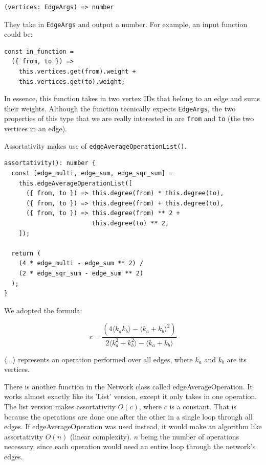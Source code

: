 \begin{verbatim}
(vertices: EdgeArgs) => number
\end{verbatim}

They take in \texttt{EdgeArgs} and output a number.
For example, an input function could be:

\begin{verbatim}
const in_function =
  ({ from, to }) =>
    this.vertices.get(from).weight +
    this.vertices.get(to).weight;
\end{verbatim}

In essence, this function takes in two vertex IDs that belong to an edge and sums their weights.
Although the function tecnically expects \texttt{EdgeArgs},
the two properties of this type that we are really interested in are \texttt{from}
and \texttt{to} (the two vertices in an edge).

Assortativity makes use of \texttt{edgeAverageOperationList()}.

\begin{verbatim}
assortativity(): number {
  const [edge_multi, edge_sum, edge_sqr_sum] =
    this.edgeAverageOperationList([
      ({ from, to }) => this.degree(from) * this.degree(to),
      ({ from, to }) => this.degree(from) + this.degree(to),
      ({ from, to }) => this.degree(from) ** 2 +
                        this.degree(to) ** 2,
    ]);

  return (
    (4 * edge_multi - edge_sum ** 2) /
    (2 * edge_sqr_sum - edge_sum ** 2)
  );
}
\end{verbatim}

We adopted the formula:

$$r=\frac{(4\langle k_a k_b\rangle-\langle k_a+k_b\rangle^2)}{2\langle k_a^2+k_b^2\rangle-\langle k_a+k_b\rangle}$$

$\langle ... \rangle$ represents an operation performed over all edges,
where $k_a$ and $k_b$ are its vertices.

There is another function in the Network class called edgeAverageOperation.
It works almost exactly like its 'List' version, except it only takes in one operation.
The list version makes assortativity $O(c)$, where $c$ is a constant.
That is because the operations are done one after the other in a single loop through all edges.
If edgeAverageOperation was used instead, it would make an algorithm like assortativity $O(n)$ (linear complexity).
$n$ being the number of operations necessary, since each operation would need an entire loop through the network's edges.

